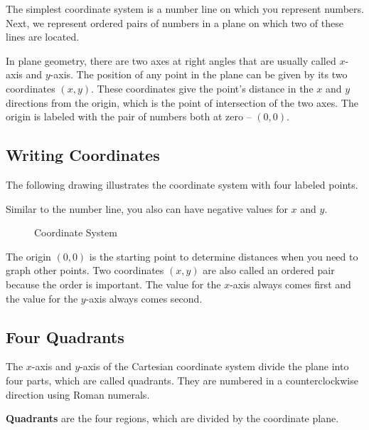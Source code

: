 The simplest coordinate system is a number line on which you represent numbers.
Next, we represent ordered pairs of numbers in a plane on which two of these
lines are located.

In plane geometry, there are two axes at right angles that are usually called
$x$-axis and $y$-axis. The position of any point in the plane can be given by
its two coordinates $(x, y)$. These coordinates give the point's distance in
the $x$ and $y$ directions from the origin, which is the point of intersection
of the two axes. The origin is labeled with the pair of numbers both at zero --
$(0, 0)$.

\subsection{Writing Coordinates}
\label{sub_sec:writing_coordinates}

The following drawing illustrates the coordinate system with four labeled points.

\begin{note}
  Similar to the number line, you also can have negative values for $x$ and
  $y$.
\end{note}

\begin{figure}[ht]
  \centering
  \caption{Coordinate System}
  \label{fig:coordinate_system}
\end{figure}

The origin $(0,0)$ is the starting point to determine distances when you need
to graph other points.  Two coordinates $(x,y)$ are also called an ordered pair
because the order is important. The value for the $x$-axis always comes first
and the value for the $y$-axis always comes second.


\subsection{Four Quadrants}
\label{sub_sec:four_quadrants}

The $x$-axis and $y$-axis of the Cartesian coordinate system divide the plane
into four parts, which are called quadrants. They are numbered in a
counterclockwise direction using Roman numerals.

\begin{definition}[Quadrants]
  \label{def:quadrants}

  \textbf{Quadrants} are the four regions, which are divided by the coordinate
  plane.
\end{definition}

